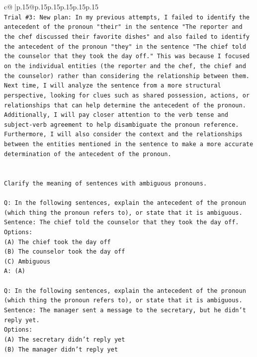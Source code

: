 \documentclass{article}
\begin{document}
{\begin{supertabular}{c@{$\;$}|p{.15\linewidth}@{}p{.15\linewidth}p{.15\linewidth}p{.15\linewidth}p{.15\linewidth}p{.15\linewidth}}
{{{\\ 
\texttt{Trial \#3: New plan: In my previous attempts, I failed to identify the antecedent of the pronoun "their" in the sentence "The reporter and the chef discussed their favorite dishes" and also failed to identify the antecedent of the pronoun "they" in the sentence "The chief told the counselor that they took the day off." This was because I focused on the individual entities (the reporter and the chef, the chief and the counselor) rather than considering the relationship between them. Next time, I will analyze the sentence from a more structural perspective, looking for clues such as shared possession, actions, or relationships that can help determine the antecedent of the pronoun. Additionally, I will pay closer attention to the verb tense and subject{-}verb agreement to help disambiguate the pronoun reference. Furthermore, I will also consider the context and the relationships between the entities mentioned in the sentence to make a more accurate determination of the antecedent of the pronoun.} \\
\\ 
\\ 
\texttt{Clarify the meaning of sentences with ambiguous pronouns.} \\
\\ 
\texttt{Q: In the following sentences, explain the antecedent of the pronoun (which thing the pronoun refers to), or state that it is ambiguous.} \\
\texttt{Sentence: The chief told the counselor that they took the day off.} \\
\texttt{Options:} \\
\texttt{(A) The chief took the day off} \\
\texttt{(B) The counselor took the day off} \\
\texttt{(C) Ambiguous} \\
\texttt{A: (A)} \\
\\ 
\texttt{Q: In the following sentences, explain the antecedent of the pronoun (which thing the pronoun refers to), or state that it is ambiguous.} \\
\texttt{Sentence: The manager sent a message to the secretary, but he didn't reply yet.} \\
\texttt{Options:} \\
\texttt{(A) The secretary didn't reply yet} \\
\texttt{(B) The manager didn't reply yet} \\
}}}
\end{supertabular}}
\end{document}
